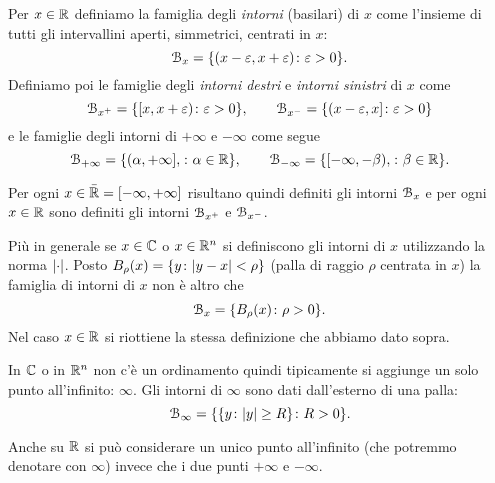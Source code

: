 \begin{definition}[intorno]
Per $x\in {\mathbb R}$ definiamo la famiglia degli \emph{intorni}%
%
 (basilari) di $x$
come l'insieme di tutti gli intervallini aperti, simmetrici, centrati in $x$:
\[
  \mathcal B_x = {\left\{  (x-\varepsilon, x+\varepsilon) \colon \varepsilon>0 \right\}}.
\]
Definiamo poi le famiglie 
degli \emph{intorni destri} e \emph{intorni sinistri}
%
di $x$ come
\[
  \mathcal B_{x^+} = {\left\{  [x, x+\varepsilon) \colon \varepsilon>0 \right\}},
  \qquad
  \mathcal B_{x^-} = {\left\{  (x-\varepsilon , x] \colon \varepsilon>0 \right\}}
\]
e le famiglie degli intorni di $+\infty$ e $-\infty$ come segue
\[
  \mathcal B_{+\infty} = {\left\{  (\alpha,+\infty], \colon \alpha \in {\mathbb R}  \right\}},\qquad
  \mathcal B_{-\infty} = {\left\{  [-\infty, -\beta), \colon \beta\in {\mathbb R} \right\}}.
\]

Per ogni $x\in \bar {{\mathbb R}} = [-\infty, +\infty]$
risultano quindi definiti gli intorni $\mathcal B_x$ e per
ogni $x\in {\mathbb R}$ sono definiti gli intorni $\mathcal B_{x^+}$ e $\mathcal B_{x^-}$.

Più in generale se $x\in {\mathbb C}$ o $x\in {\mathbb R}^n$
si definiscono gli intorni di $x$ 
utilizzando la norma ${\left|\cdot\right|}$.
Posto $B_\rho(x) = {\left\{ y\colon {\left|y-x\right|}<\rho \right\}}$
(palla di raggio $\rho$ centrata in $x$)
la famiglia di intorni di $x$ non è altro che
\[
  \mathcal B_x = {\left\{ B_\rho(x)\colon \rho>0 \right\}}.
\]
Nel caso $x\in {\mathbb R}$ si riottiene la stessa definizione che 
abbiamo dato sopra.

In ${\mathbb C}$ o in ${\mathbb R}^n$ non c'è un ordinamento quindi 
tipicamente si aggiunge un solo punto all'infinito: $\infty$.
Gli intorni di $\infty$
sono dati dall'esterno di una palla:
\[
  \mathcal B_\infty = {\left\{ {\left\{ y\colon {\left|y\right|}\ge R \right\}}\colon R>0 \right\}}.
\]

Anche su ${\mathbb R}$ si può considerare un unico punto 
all'infinito (che potremmo denotare con $\infty$)
invece che i due punti $+\infty$ e $-\infty$.
\end{definition}

